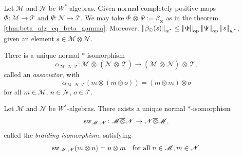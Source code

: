 \begin{proposition} \cite[Proof 115 III] {westerbaanCategoryNeumannAlgebras2019} \label{prop:norm_beta_alg}
  Let  $\mathscr{M}$ and $\mathscr{N}$ be $W^*$-algebras.
  Given normal completely positive maps $\Phi:\mathscr{M} \to \mathscr{T}$ and $\Psi:\mathscr{N} \to \mathscr{T}$. We may take $\Phi\, \overline{\otimes} \,\Psi:= \beta_{\bar{\otimes}}$ as in the theorem \autoref{thm:beta_alg_eq_beta_gamma}. Moreover, $\left\lVert \beta_\odot(s) \right\rVert_{\text{$w^*$}} \leq \left\lVert \Phi \right\rVert_{\text{op}}\left\lVert \Psi \right\rVert_{\text{op}}\left\lVert s \right\rVert_{\text{$w^*$}}$, given an element $s\in \mathscr{M} \overline{\otimes} \mathscr{N}$.
\end{proposition}

\begin{proposition} \cite[Corollary 119 IV]{westerbaanCategoryNeumannAlgebras2019} 
  \label{prop:assoc_nmiu}
   There is a unique normal $\ast$-isomorphism
\[
\alpha_{\mathscr{M},\mathscr{N},\mathscr{T}} : \mathscr{M}\, \overline{\otimes} \, (\mathscr{N} \,\overline{\otimes} \,\mathscr{T}) \longrightarrow (\mathscr{M} \, \overline{\otimes} \, \mathscr{N} ) \, \overline{\otimes} \, \mathscr{T},
\]
called an \emph{associator}, with
\[
\alpha_{\mathscr{M},\mathscr{N},\mathscr{T}}(m \otimes (m \otimes o)) = (m \otimes m) \otimes o
\]
for all \( m \in \mathscr{M} \), \( n \in \mathscr{N} \), \( o \in \mathscr{T} \).
\end{proposition}


\begin{proposition} \cite[Exercise 119 IVc]{westerbaanCategoryNeumannAlgebras2019} \label{prop:swap_nmiu}
  Let $\mathscr{M}$ and $\mathscr{N}$ be $W^*$-algebras.
There exists a unique normal $\ast$-isomorphism
\[
    \mathrm{sw}_{\mathscr{M},\mathscr{N}} \colon \mathscr{M} \overline{\otimes} \mathscr{N} \to \mathscr{N} \overline{\otimes} \mathscr{M},
    \]
    called the \emph{braiding isomorphism}, satisfying
    \[
    \mathrm{sw}_{\mathscr{M},\mathscr{N}}(m \otimes n) = n \otimes m \quad \text{for all } n \in \mathscr{M}, m \in \mathscr{N}.
    \]
\end{proposition}


